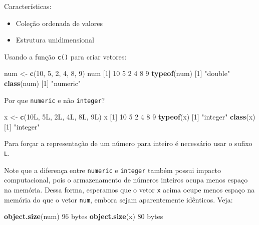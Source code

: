 \documentclass[10pt,a4paper]{book}
\newenvironment{Shaded}{\begin{snugshade}}{\end{snugshade}}
\newcommand{\KeywordTok}[1]{\textcolor[rgb]{0.13,0.29,0.53}{\textbf{#1}}}
\newcommand{\DecValTok}[1]{\textcolor[rgb]{0.00,0.00,0.81}{#1}}
\newcommand{\StringTok}[1]{\textcolor[rgb]{0.31,0.60,0.02}{#1}}
\newcommand{\NormalTok}[1]{#1}
\providecommand{\tightlist}{%
  \setlength{\itemsep}{0pt}\setlength{\parskip}{0pt}}
\begin{document}
Características:

\begin{itemize}
\tightlist
\item
  Coleção ordenada de valores
\item
  Estrutura unidimensional
\end{itemize}

Usando a função \texttt{c()} para criar vetores:

\begin{Shaded}
\begin{Highlighting}[]
\NormalTok{num <-}\StringTok{ }\KeywordTok{c}\NormalTok{(}\DecValTok{10}\NormalTok{, }\DecValTok{5}\NormalTok{, }\DecValTok{2}\NormalTok{, }\DecValTok{4}\NormalTok{, }\DecValTok{8}\NormalTok{, }\DecValTok{9}\NormalTok{)}
\NormalTok{num}
\NormalTok{[}\DecValTok{1}\NormalTok{] }\DecValTok{10}  \DecValTok{5}  \DecValTok{2}  \DecValTok{4}  \DecValTok{8}  \DecValTok{9}
\KeywordTok{typeof}\NormalTok{(num)}
\NormalTok{[}\DecValTok{1}\NormalTok{] }\StringTok{"double"}
\KeywordTok{class}\NormalTok{(num)}
\NormalTok{[}\DecValTok{1}\NormalTok{] }\StringTok{"numeric"}
\end{Highlighting}
\end{Shaded}

Por que \texttt{numeric} e não \texttt{integer}?

\begin{Shaded}
\begin{Highlighting}[]
\NormalTok{x <-}\StringTok{ }\KeywordTok{c}\NormalTok{(10L, 5L, 2L, 4L, 8L, 9L)}
\NormalTok{x}
\NormalTok{[}\DecValTok{1}\NormalTok{] }\DecValTok{10}  \DecValTok{5}  \DecValTok{2}  \DecValTok{4}  \DecValTok{8}  \DecValTok{9}
\KeywordTok{typeof}\NormalTok{(x)}
\NormalTok{[}\DecValTok{1}\NormalTok{] }\StringTok{"integer"}
\KeywordTok{class}\NormalTok{(x)}
\NormalTok{[}\DecValTok{1}\NormalTok{] }\StringTok{"integer"}
\end{Highlighting}
\end{Shaded}

Para forçar a representação de um número para inteiro é necessário usar
o sufixo \texttt{L}.

Note que a diferença entre \texttt{numeric} e \texttt{integer} também
possui impacto computacional, pois o armazenamento de números inteiros
ocupa menos espaço na memória. Dessa forma, esperamos que o vetor
\texttt{x} acima ocupe menos espaço na memória do que o vetor
\texttt{num}, embora sejam aparentemente idênticos. Veja:

\begin{Shaded}
\begin{Highlighting}[]
\KeywordTok{object.size}\NormalTok{(num)}
\DecValTok{96}\NormalTok{ bytes}
\KeywordTok{object.size}\NormalTok{(x)}
\DecValTok{80}\NormalTok{ bytes}
\end{Highlighting}
\end{Shaded}
\end{document}
